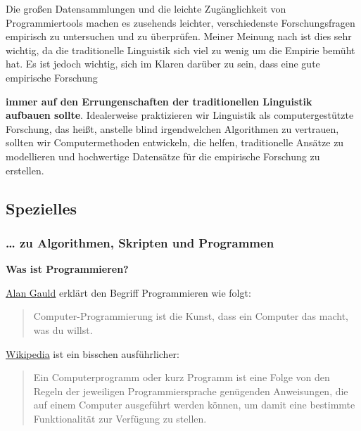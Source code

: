 Die großen Datensammlungen und die leichte Zugänglichkeit von
Programmiertools machen es zusehends leichter, verschiedenste
Forschungsfragen empirisch zu untersuchen und zu überprüfen. Meiner
Meinung nach ist dies sehr wichtig, da die traditionelle Linguistik sich
viel zu wenig um die Empirie bemüht hat. Es ist jedoch wichtig, sich im
Klaren darüber zu sein, dass eine gute empirische Forschung
\vspace{0.5cm}\par\noindent\textbf{immer auf den Errungenschaften der traditionellen Linguistik\vspace{0.5cm}
aufbauen sollte}. Idealerweise praktizieren wir Linguistik als
{computergestützte Forschung}, das heißt, anstelle blind irgendwelchen
Algorithmen zu vertrauen, sollten wir Computermethoden entwickeln, die
helfen, traditionelle Ansätze zu modellieren und hochwertige Datensätze
für die empirische Forschung zu erstellen.

\subsection{Spezielles}

\subsubsection{\texorpdfstring{{\ldots{} zu Algorithmen, Skripten und
Programmen}}{\ldots{} zu Algorithmen, Skripten und Programmen}}

\vspace{0.5cm}\par\noindent\textbf{Was ist Programmieren?}\vspace{0.5cm}

\href{http://www.freenetpages.co.uk/hp/alan.gauld/german/tutwhat.htm}{Alan
Gauld} erklärt den Begriff Programmieren wie folgt:

\begin{quote}
Computer-Programmierung ist die Kunst, dass ein Computer das macht, was
du willst.
\end{quote}

{\href{http://de.wikipedia.org/wiki/Computerprogramm}{Wikipedia} ist ein
bisschen ausführlicher:}

\begin{quote}
Ein Computerprogramm oder kurz Programm ist eine Folge von den Regeln
der jeweiligen Programmiersprache genügenden Anweisungen, die auf einem
Computer ausgeführt werden können, um damit eine bestimmte
Funktionalität zur Verfügung zu stellen.
\end{quote}




